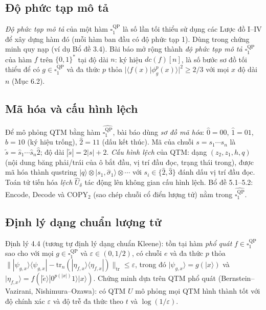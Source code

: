 \documentclass[10pt]{article}
\begin{document}
\subsection*{Độ phức tạp mô tả}
\emph{Độ phức tạp mô tả} của một hàm $\square_1^{\mathrm{QP}}$ là số lần tối thiểu sử dụng các Lược đồ I--IV để xây dựng hàm đó (mỗi hàm ban đầu có độ phức tạp 1). Dùng trong chứng minh quy nạp (ví dụ Bổ đề 3.4). Bài báo mở rộng thành \emph{độ phức tạp mô tả $\square_1^{\mathrm{QP}}$} của hàm $f$ trên $\{0,1\}^*$ tại độ dài $n$: ký hiệu $dc(f)[n]$, là số bước sơ đồ tối thiểu để có $g\in\square_1^{\mathrm{QP}}$ và đa thức $p$ thỏa $|\langle f(x)|\phi_g^p(x)\rangle|^2\ge 2/3$ với mọi $x$ độ dài $n$ (Mục 6.2).

\subsection*{Mã hóa và cấu hình lệch}
Để mô phỏng QTM bằng hàm $\widehat{\square_1^{\mathrm{QP}}}$, bài báo dùng \emph{sơ đồ mã hóa}: $\hat{0}=00$, $\hat{1}=01$, $\hat{b}=10$ (ký hiệu trống), $\hat{2}=11$ (dấu kết thúc). Mã của chuỗi $s=s_1\cdots s_n$ là $\tilde{s}=\hat{s}_1\cdots\hat{s}_n\hat{2}$; độ dài $|\tilde{s}|=2|s|+2$. \emph{Cấu hình lệch} của QTM: dạng $(z_2,z_1,h,q)$ (nội dung băng phải/trái của ô bắt đầu, vị trí đầu đọc, trạng thái trong), được mã hóa thành qustring $|q\rangle\otimes|s_1,\hat{\sigma}_1\rangle\otimes\cdots$ với $s_i\in\{\hat{2},\hat{3}\}$ đánh dấu vị trí đầu đọc. Toán tử tiến hóa \emph{lệch} $\widehat{U}_\delta$ tác động lên không gian cấu hình lệch. Bổ đề 5.1--5.2: Encode, Decode và COPY$_2$ (sao chép chuỗi cổ điển lượng tử) nằm trong $\widehat{\square_1^{\mathrm{QP}}}$.

\subsection*{Định lý dạng chuẩn lượng tử}
Định lý 4.4 (tương tự định lý dạng chuẩn Kleene): tồn tại hàm \emph{phổ quát} $f\in\square_1^{\mathrm{QP}}$ sao cho với mọi $g\in\square_1^{\mathrm{QP}}$ và $\varepsilon\in(0,1/2)$, có chuỗi $e$ và đa thức $p$ thỏa $\||\psi_{g,x}\rangle\langle\psi_{g,x}|-\mathrm{tr}_n(|\eta_{f,x}\rangle\langle\eta_{f,x}|)\|_{\mathrm{tr}}\le\varepsilon$, trong đó $|\psi_{g,x}\rangle=g(|x\rangle)$ và $|\eta_{f,x}\rangle=f(|\tilde{e}\rangle|0^{p(|x|)}1\rangle|x\rangle)$. Chứng minh dựa trên QTM phổ quát (Bernstein–Vazirani, Nishimura–Ozawa): có QTM $U$ mô phỏng mọi QTM hình thành tốt với độ chính xác $\varepsilon$ và độ trễ đa thức theo $t$ và $\log(1/\varepsilon)$.
\end{document}
